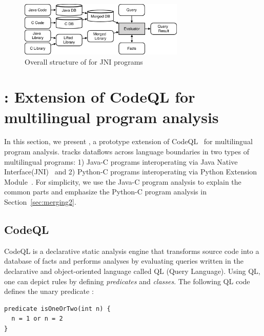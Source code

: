 \begin{figure}[t]
  \centering
  \vspace{2mm}
  \includegraphics[width=0.7\textwidth]{img/codeql.pdf}
  \caption{Overall structure of \ours for JNI programs}
  \label{fig:codeql}
\end{figure}

\section{\ours: Extension of CodeQL for multilingual program analysis}\label{sec:impl}
In this section, we present \ours, a prototype extension of
CodeQL~\cite{codeql} for multilingual program analysis.
\ours tracks dataflows
across language boundaries in two types of multilingual programs: 1) Java-C
programs interoperating via Java Native Interface(JNI)~\cite{jnispec} and 2)
Python-C programs interoperating via Python Extension Module~\cite{pyext}.  For
simplicity, we use the Java-C program analysis to explain the common parts and
emphasize the Python-C program analysis in Section~\ref{sec:merging2}.


\subsection{CodeQL}
CodeQL is a declarative static analysis engine that transforms source code into
a database of facts and performs analyses by evaluating queries written in the
declarative and object-oriented language called QL (Query Language). Using QL,
one can depict rules by defining \textit{ predicates} and \textit{ classes}. The following
QL code defines the  unary predicate :

\begin{lstlisting}[style=codeql,xleftmargin=2.5em]
predicate isOneOrTwo(int n) {
  n = 1 or n = 2
}
\end{lstlisting}


